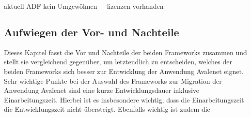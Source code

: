 aktuell ADF kein Umgewöhnen + lizenzen vorhanden

\subsection{Aufwiegen der Vor- und Nachteile}
Dieses Kapitel fasst die Vor und Nachteile der beiden Frameworks zusammen und stellt sie vergleichend gegenüber, um letztendlich zu entscheiden, welches der beiden Frameworks sich besser zur Entwicklung der Anwendung Avalenet eignet.
Sehr wichtige Punkte bei der Auswahl des Frameworks zur Migration der Anwendung Avalenet sind eine kurze Entwicklungsdauer inklusive Einarbeitungszeit. Hierbei ist es insbesondere wichtig, dass die Einarbeitungszeit die Entwicklungszeit nicht übersteigt. Ebenfalls wichtig ist zudem die
